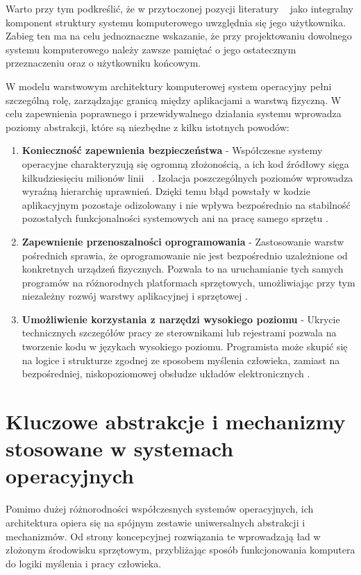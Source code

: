 Warto przy tym podkreślić, że w przytoczonej pozycji literatury ~\cite{Abraham_Silberschatz} jako integralny komponent struktury systemu komputerowego uwzględnia się jego użytkownika. 
Zabieg ten ma na celu jednoznaczne wskazanie, że przy projektowaniu dowolnego systemu komputerowego należy zawsze pamiętać o jego ostatecznym przeznaczeniu oraz o użytkowniku końcowym.

W modelu warstwowym architektury komputerowej system operacyjny pełni szczególną rolę, zarządzając granicą między aplikacjami a warstwą fizyczną. W celu zapewnienia poprawnego i przewidywalnego działania systemu wprowadza poziomy abstrakcji, które są niezbędne z kilku istotnych powodów:

\begin{enumerate}
\item \textbf{Konieczność zapewnienia bezpieczeństwa } - Współczesne systemy operacyjne charakteryzują się ogromną złożonością, a ich kod źródłowy sięga kilkudziesięciu milionów linii ~\cite{Tanenbaum}.
 Izolacja poszczególnych poziomów wprowadza wyraźną hierarchię uprawnień. Dzięki temu błąd powstały w kodzie aplikacyjnym pozostaje odizolowany i nie wpływa bezpośrednio na stabilność pozostałych funkcjonalności systemowych ani na pracę samego sprzętu \cite{Abraham_Silberschatz}.
\item \textbf{Zapewnienie przenoszalności oprogramowania} - Zastosowanie warstw pośrednich sprawia, że oprogramowanie nie jest bezpośrednio uzależnione od konkretnych urządzeń fizycznych. Pozwala to na uruchamianie tych samych programów na różnorodnych platformach sprzętowych,
 umożliwiając przy tym niezależny rozwój warstwy aplikacyjnej i sprzętowej \cite{Abraham_Silberschatz}.
\item \textbf{Umożliwienie korzystania z narzędzi wysokiego poziomu} - Ukrycie technicznych szczegółów pracy ze sterownikami lub rejestrami pozwala na tworzenie kodu w językach wysokiego poziomu. Programista może skupić się na logice i strukturze zgodnej ze sposobem myślenia człowieka, zamiast na bezpośredniej, niskopoziomowej obsłudze układów elektronicznych \cite{Abraham_Silberschatz}.
\end{enumerate}
\section{Kluczowe abstrakcje i mechanizmy stosowane w systemach operacyjnych}
Pomimo dużej różnorodności współczesnych systemów operacyjnych, ich architektura opiera się na spójnym zestawie uniwersalnych abstrakcji i mechanizmów. Od strony koncepcyjnej rozwiązania te wprowadzają ład w złożonym środowisku sprzętowym, przybliżając sposób funkcjonowania komputera do logiki myślenia i pracy człowieka. 

